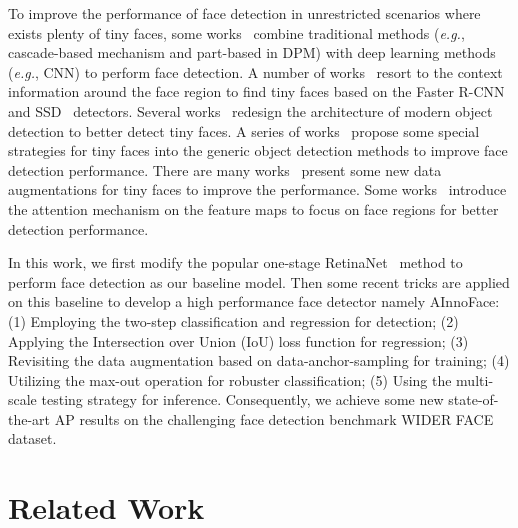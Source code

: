 \documentclass{article} \usepackage{nips13submit_e,times}
\def\eg{{\em e.g.}}
\begin{document}
To improve the performance of face detection in unrestricted scenarios where exists plenty of tiny faces, some works~\cite{DBLP:conf/icb/YangYLL14,DBLP:conf/iccv/YangLLT15,DBLP:journals/spl/ZhangZLQ16,DBLP:conf/icpr/Ohn-BarT16a,DBLP:journals/corr/YangXLT17} combine traditional methods (\eg, cascade-based mechanism and part-based in DPM) with deep learning methods (\eg, CNN) to perform face detection. A number of works~\cite{DBLP:journals/corr/ZhuZLS16,DBLP:conf/cvpr/HuR17,DBLP:conf/iccv/NajibiSCD17} resort to the context information around the face region to find tiny faces based on the Faster R-CNN~\cite{DBLP:journals/pami/RenHG017} and SSD~\cite{DBLP:conf/eccv/LiuAESRFB16} detectors. Several works~\cite{DBLP:conf/eccv/CaiFFV16,DBLP:journals/corr/abs-1809-02693,DBLP:journals/corr/abs-1712-00721,DBLP:journals/corr/abs-1811-08557} redesign the architecture of modern object detection to better detect tiny faces. A series of works~\cite{DBLP:journals/corr/WangLJW17,DBLP:journals/corr/abs-1709-05256,DBLP:conf/iccv/abs-1708-05237,zhu2018seeing,DBLP:journals/corr/abs-1802-02142} propose some special strategies for tiny faces into the generic object detection methods to improve face detection performance. There are many works~\cite{tang2018pyramidbox,DBLP:journals/corr/abs-1901-06651,DBLP:journals/corr/abs-1810-10220} present some new data augmentations for tiny faces to improve the performance. Some works~\cite{wang2017fan,DBLP:journals/corr/abs-1901-02350} introduce the attention mechanism on the feature maps to focus on face regions for better detection performance.

In this work, we first modify the popular one-stage RetinaNet~\cite{DBLP:conf/iccv/LinPRK17} method to perform face detection as our baseline model. Then some recent tricks are applied on this baseline to develop a high performance face detector namely AInnoFace: (1) Employing the two-step classification and regression for detection; (2) Applying the Intersection over Union (IoU) loss function for regression; (3) Revisiting the data augmentation based on data-anchor-sampling for training; (4) Utilizing the max-out operation for robuster classification; (5) Using the multi-scale testing strategy for inference. Consequently, we achieve some new state-of-the-art AP results on the challenging face detection benchmark WIDER FACE~\cite{DBLP:conf/cvpr/YangLLT16} dataset.


\section{Related Work}
\end{document}
